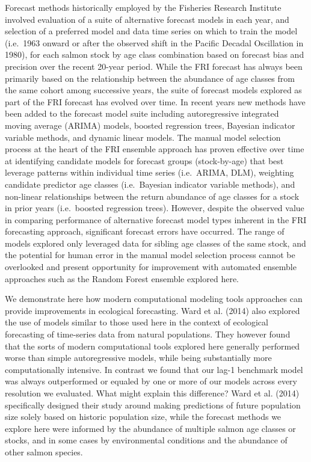 \documentclass[
]{article}
\begin{document}
Forecast methods historically employed by the Fisheries Research Institute involved evaluation of a suite of alternative forecast models in each year, and selection of a preferred model and data time series on which to train the model (i.e.~1963 onward or after the observed shift in the Pacific Decadal Oscillation in 1980), for each salmon stock by age class combination based on forecast bias and precision over the recent 20-year period. While the FRI forecast has always been primarily based on the relationship between the abundance of age classes from the same cohort among successive years, the suite of forecast models explored as part of the FRI forecast has evolved over time. In recent years new methods have been added to the forecast model suite including autoregressive integrated moving average (ARIMA) models, boosted regression trees, Bayesian indicator variable methods, and dynamic linear models. The manual model selection process at the heart of the FRI ensemble approach has proven effective over time at identifying candidate models for forecast groups (stock-by-age) that best leverage patterns within individual time series (i.e.~ARIMA, DLM), weighting candidate predictor age classes (i.e.~Bayesian indicator variable methods), and non-linear relationships between the return abundance of age classes for a stock in prior years (i.e.~boosted regression trees). However, despite the observed value in comparing performance of alternative forecast model types inherent in the FRI forecasting approach, significant forecast errors have occurred. The range of models explored only leveraged data for sibling age classes of the same stock, and the potential for human error in the manual model selection process cannot be overlooked and present opportunity for improvement with automated ensemble approaches such as the Random Forest ensemble explored here.

We demonstrate here how modern computational modeling tools approaches can provide improvements in ecological forecasting. Ward et al. (2014) also explored the use of models similar to those used here in the context of ecological forecasting of time-series data from natural populations. They however found that the sorts of modern computational tools explored here generally performed worse than simple autoregressive models, while being substantially more computationally intensive. In contrast we found that our lag-1 benchmark model was always outperformed or equaled by one or more of our models across every resolution we evaluated. What might explain this difference? Ward et al. (2014) specifically designed their study around making predictions of future population size solely based on historic population size, while the forecast methods we explore here were informed by the abundance of multiple salmon age classes or stocks, and in some cases by environmental conditions and the abundance of other salmon species.
\end{document}
